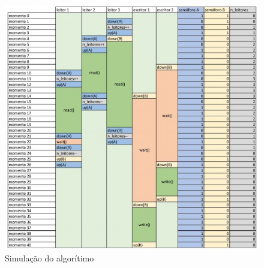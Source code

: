 \documentclass[12pt, a4paper]{article}
\begin{document}
\begin{figure}[!htb]
	\centering
	\caption{\label{fig:tabela.pdf} Simulação do algorítimo}
	\includegraphics[keepaspectratio, width=\textwidth]{tabela.jpeg}
\end{figure}
\end{document}
